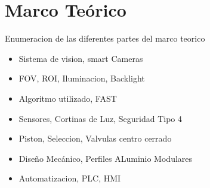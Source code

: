 \documentclass[12pt, twoside, letterpaper]{book}
\begin{document}
\chapter{Marco Te\'orico}

Enumeracion de las diferentes partes del marco teorico

\begin{itemize}
    \item Sistema de vision, smart Cameras
    \item FOV, ROI, Iluminacion, Backlight
    \item Algoritmo utilizado, FAST
    \item Sensores, Cortinas de Luz, Seguridad Tipo 4
    \item Piston, Seleccion, Valvulas centro cerrado
    \item Dise\~no Mec\'anico, Perfiles ALuminio Modulares
    \item Automatizacion, PLC, HMI
     
\end{itemize}











\end{document}
